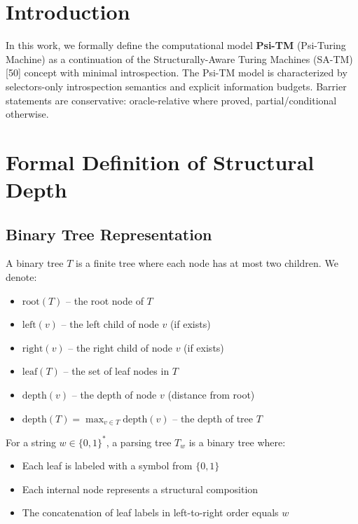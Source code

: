   
  
  \section{Introduction}\label{sec:introduction}
  
  In this work, we formally define the computational model \textbf{Psi-TM} (Psi-Turing Machine) as a continuation of the Structurally-Aware Turing Machines (SA-TM) [50] concept with minimal introspection. The Psi-TM model is characterized by selectors-only introspection semantics and explicit information budgets. Barrier statements are conservative: oracle-relative where proved, partial/conditional otherwise.
  
  \section{Formal Definition of Structural Depth}
  
  \subsection{Binary Tree Representation}
  
  \begin{definition}
  A binary tree $T$ is a finite tree where each node has at most two children. We denote:
  \begin{itemize}
  \item $\text{root}(T)$ -- the root node of $T$
  \item $\text{left}(v)$ -- the left child of node $v$ (if exists)
  \item $\text{right}(v)$ -- the right child of node $v$ (if exists)
  \item $\text{leaf}(T)$ -- the set of leaf nodes in $T$
  \item $\text{depth}(v)$ -- the depth of node $v$ (distance from root)
  \item $\text{depth}(T) = \max_{v \in T} \text{depth}(v)$ -- the depth of tree $T$
  \end{itemize}
  \end{definition}
  
  \begin{definition}
  For a string $w \in \{0,1\}^*$, a parsing tree $T_w$ is a binary tree where:
  \begin{itemize}
  \item Each leaf is labeled with a symbol from $\{0,1\}$
  \item Each internal node represents a structural composition
  \item The concatenation of leaf labels in left-to-right order equals $w$
  \end{itemize}
  \end{definition}
  
